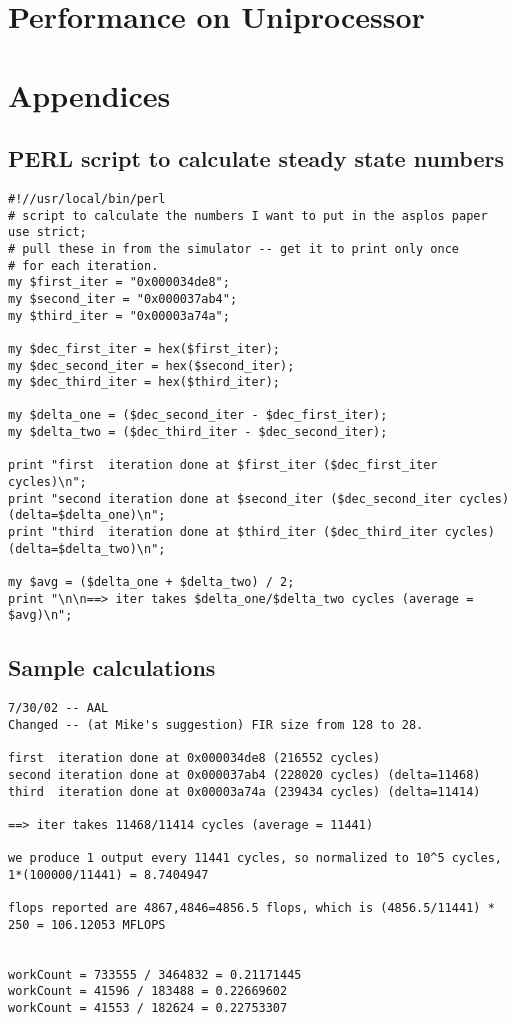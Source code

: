 \documentclass{article}
\begin{document}
\section{Performance on Uniprocessor}

\section{Appendices}
\subsection{PERL script to calculate steady state numbers}
\begin{verbatim}
#!//usr/local/bin/perl
# script to calculate the numbers I want to put in the asplos paper
use strict;
# pull these in from the simulator -- get it to print only once
# for each iteration.
my $first_iter = "0x000034de8";
my $second_iter = "0x000037ab4";
my $third_iter = "0x00003a74a";

my $dec_first_iter = hex($first_iter);
my $dec_second_iter = hex($second_iter);
my $dec_third_iter = hex($third_iter);

my $delta_one = ($dec_second_iter - $dec_first_iter);
my $delta_two = ($dec_third_iter - $dec_second_iter);

print "first  iteration done at $first_iter ($dec_first_iter cycles)\n";
print "second iteration done at $second_iter ($dec_second_iter cycles) (delta=$delta_one)\n";
print "third  iteration done at $third_iter ($dec_third_iter cycles) (delta=$delta_two)\n";

my $avg = ($delta_one + $delta_two) / 2;
print "\n\n==> iter takes $delta_one/$delta_two cycles (average = $avg)\n";
\end{verbatim}




\subsection{Sample calculations}
\begin{verbatim}
7/30/02 -- AAL 
Changed -- (at Mike's suggestion) FIR size from 128 to 28.

first  iteration done at 0x000034de8 (216552 cycles)
second iteration done at 0x000037ab4 (228020 cycles) (delta=11468)
third  iteration done at 0x00003a74a (239434 cycles) (delta=11414)

==> iter takes 11468/11414 cycles (average = 11441)

we produce 1 output every 11441 cycles, so normalized to 10^5 cycles, 1*(100000/11441) = 8.7404947

flops reported are 4867,4846=4856.5 flops, which is (4856.5/11441) * 250 = 106.12053 MFLOPS


workCount = 733555 / 3464832 = 0.21171445
workCount = 41596 / 183488 = 0.22669602
workCount = 41553 / 182624 = 0.22753307
\end{verbatim}
\end{document}

